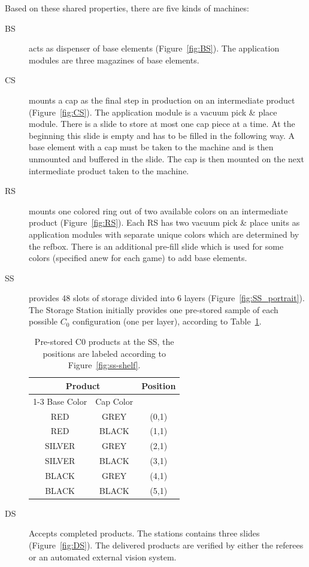 \documentclass[12pt,twoside]{article}
\newcommand{\reffig}[1]{Figure~\ref{#1}}
\newcommand{\reftab}[1]{Table~\ref{#1}}
\begin{document}
Based on these shared properties, there are five kinds of machines:

\begin{description}
\item[\acf{BS}] acts as dispenser of base elements
  (\reffig{fig:BS}). The application modules are three magazines of
  base elements.

\item[\acf{CS}] mounts a cap as the final step in production
  on an intermediate product (\reffig{fig:CS}). The application module
  is a vacuum pick \& place module. There is a slide to store at most
  one cap piece at a time. At the beginning this slide is empty and
  has to be filled in the following way.  A base element with a cap
  must be taken to the machine and is then unmounted and buffered in
  the slide. The cap is then mounted on the next intermediate product
  taken to the machine.

\item[\acf{RS}] mounts one colored ring out of two available
  colors on an intermediate product (\reffig{fig:RS}). Each \ac{RS} has two
  vacuum pick \& place units as application modules with separate
  unique colors which are determined by the \ac{refbox}. There is an
  additional pre-fill slide which is used for some colors (specified
  anew for each game) to add base elements.

\item[\acf{SS}] provides 48 slots of storage divided into
  6 layers (\reffig{fig:SS_portrait}).
  The Storage Station initially provides one pre-stored sample of each possible
  $C_0$ configuration (one per layer), according to \reftab{tab:ss-c0-init}.
\begin{table}
  \begin{tabular}{c|c||c}
    \hline
    \multicolumn{2}{c||}{\bf{Product}} &
    \multicolumn{1}{c}{\bf{Position}} \\\cline{1-3}
    Base Color & Cap Color  & \\\hline
    RED    & GREY  & (0,1) \\
    RED    & BLACK & (1,1) \\
    SILVER & GREY  & (2,1) \\
    SILVER & BLACK & (3,1) \\
    BLACK  & GREY  & (4,1) \\
    BLACK  & BLACK & (5,1) \\
  \end{tabular}
  \caption{Pre-stored C0 products at the \ac{SS}, the positions are labeled
    according to \reffig{fig:ss-shelf}.}
  \label{tab:ss-c0-init}
\end{table}

\item[\acf{DS}] Accepts completed products. The stations contains
  three slides (\reffig{fig:DS}). The delivered products are verified by either
  the referees or an automated external vision system.
\end{description}
\end{document}
